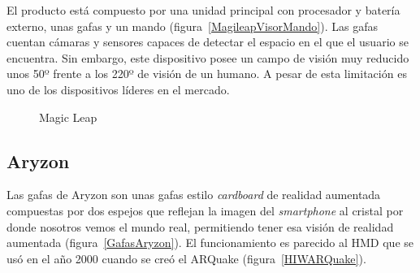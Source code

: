 El producto está compuesto por una unidad principal con procesador y batería externo, unas gafas y un mando (figura~\ref{MagileapVisorMando}). Las gafas cuentan cámaras y sensores capaces de detectar el espacio en el que el usuario se encuentra. Sin embargo, este dispositivo posee un campo de visión muy reducido unos 50º frente a los 220º de visión de un humano. A pesar de esta limitación es uno de los dispositivos líderes en el mercado.

\begin{figure}[H]
\centering
{}
\caption[Magic Leap]{Magic Leap\footnotemark}\label{fig:MagicLeap}
\end{figure}

\subsection{Aryzon}\label{AryzonSection}
Las gafas de Aryzon son unas gafas estilo \textit{cardboard} de realidad aumentada compuestas por dos espejos que reflejan la imagen del \textit{smartphone} al cristal por donde nosotros vemos el mundo real, permitiendo tener esa visión de realidad aumentada (figura~\ref{GafasAryzon}). El funcionamiento es parecido al HMD que se usó en el año 2000 cuando se creó el ARQuake (figura~\ref{HIWARQuake}).

